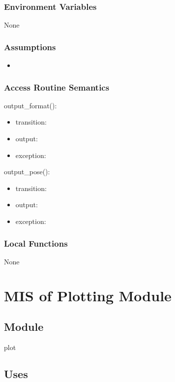 \documentclass[12pt, titlepage]{article}
\begin{document}
\subsubsection{Environment Variables}
None

\subsubsection{Assumptions}
\begin{itemize}
  \item 
\end{itemize}
\subsubsection{Access Routine Semantics}

\noindent output\_format():
\begin{itemize}
\item transition:  
\item output:  
\item exception:  
\end{itemize}

\noindent output\_pose():
\begin{itemize}
\item transition:  
\item output:  
\item exception:  
\end{itemize}


\subsubsection{Local Functions}
None

\newpage

\section{MIS of Plotting Module} \label{M_Plotting}

\subsection{Module}

plot 

\subsection{Uses}
\end{document}
